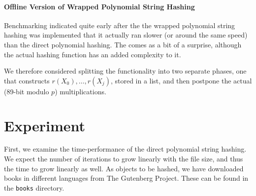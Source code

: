 \documentclass[]{article}
\newcommand{\funk}[1]{\texttt{\small #1}}
\begin{document}





\paragraph{Offline Version of Wrapped Polynomial String Hashing}

Benchmarking indicated quite early after the the wrapped polynomial string hashing was implemented that it actually ran slower (or around the same speed) than the direct polynomial hashing. The comes as a bit of a surprise, although the actual hashing function has an added complexity to it.

We therefore considered splitting the functionality into two separate phases, one that constructs $r(X_0),\dots,r(X_j)$, stored in a list, and then postpone the actual (89-bit modulo $p$) multiplications.


\section{Experiment}
First, we examine the time-performance of the direct polynomial string hashing. We expect the number of iterations to grow linearly with the file size, and thus the time to grow linearly as well.
As objects to be hashed, we have downloaded books in different languages from The Gutenberg Project. These can be found in the \funk{books} directory.
\end{document}
